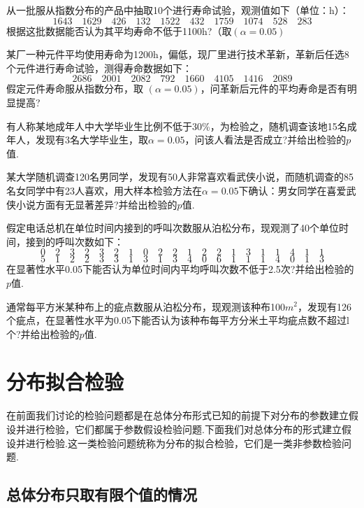 \begin{xiti}
	\item 从一批服从指数分布的产品中抽取10个进行寿命试验，观测值如下（单位：h）：
	\[1643 \quad 1629 \quad 426 \quad 132 \quad 1522 \quad 432 \quad 1759 \quad 1074 \quad 528 \quad 283\]
	根据这批数据能否认为其平均寿命不低于1100h?（取$(\alpha=0.05)$
		
	\item 某厂一种元件平均使用寿命为1200h，偏低，现厂里进行技术革新，革新后任选8个元件进行寿命试验，测得寿命数据如下：
	\[2686 \quad 2001 \quad 2082 \quad 792 \quad 1660 \quad 4105 \quad 1416 \quad 2089\]
	假定元件寿命服从指数分布，取 $(\alpha=0.05)$，问革新后元件的平均寿命是否有明显提高?
	
	\item 有人称某地成年人中大学毕业生比例不低于30\%，为检验之，随机调查该地15名成年人，发现有3名大学毕业生，取$\alpha=0.05$，问该人看法是否成立?并给出检验的$p$值.
		
	\item 某大学随机调查120名男同学，发现有50人非常喜欢看武侠小说，而随机调查的85名女同学中有23人喜欢，用大样本检验方法在$\alpha=0.05$下确认：男女同学在喜爱武侠小说方面有无显著差异?并给出检验的$p$值.
	
			
	\item 假定电话总机在单位时间内接到的呼叫次数服从泊松分布，现观测了40个单位时间，接到的呼叫次数如下：
	\[0 \quad 2 \quad 3 \quad 2 \quad 3 \quad 2 \quad 1 \quad 0 \quad 2 \quad 2 \quad 1 \quad 2 \quad 2 \quad 1 \quad 3 \quad 1 \quad 1 \quad 4 \quad 1 \quad 1\]
	\[5 \quad 1 \quad 2 \quad 2 \quad 3 \quad 3 \quad 1 \quad 3 \quad 1 \quad 3 \quad 4 \quad 0 \quad 6 \quad 1 \quad 1 \quad 1 \quad 4 \quad 0 \quad 1 \quad 3\]
	在显著性水平0.05下能否认为单位时间内平均呼叫次数不低于2.5次?并给出检验的$p$值.
				
	\item 通常每平方米某种布上的疵点数服从泊松分布，现观测该种布100$m^{2}$，发现有126个疵点，在显著性水平为0.05下能否认为该种布每平方分米土平均疵点数不超过l个?并给出检验的$p$值.
\end{xiti}
\section{分布拟合检验\label{sec:7.4}}
在前面我们讨论的检验问题都是在总体分布形式已知的前提下对分布的参数建立假设并进行检验，它们都属于参数假设检验问题.下面我们对总体分布的形式建立假设并进行检验.这一类检验问题统称为分布的拟合检验，它们是一类非参数检验问题.


\subsection{总体分布只取有限个值的情况\label{sec:7.3.1}}

